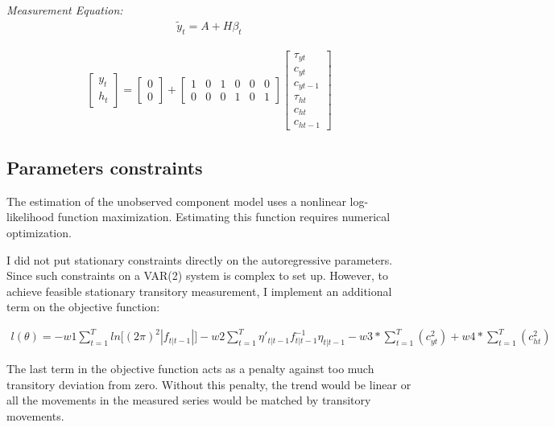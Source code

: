 \documentclass[12pt]{article}
\begin{document}
\begin{outline}[enumerate]
		\bigskip
		\textit{Measurement Equation:}
		\begin{align}
		\tilde{y}_t = A + H\beta_t
		\end{align}
		
		\begin{align*}
		\begin{bmatrix}
		y_t	\\
		h_t
		\end{bmatrix}
		=
		\begin{bmatrix}
		0	\\
		0
		\end{bmatrix}
		+
		\begin{bmatrix}
		1	& 0	& 1	& 0	& 0 & 0 \\
		0	& 0 & 0 & 1 & 0 & 1
		\end{bmatrix}
		\begin{bmatrix}
		\tau_{yt}	\\
		c_{yt}		\\
		c_{yt-1}	\\
		\tau_{ht}	\\
		c_{ht}		\\
		c_{ht-1}
		\end{bmatrix}
		\end{align*}
		
\subsection{Parameters constraints}

The estimation of the unobserved component model uses a nonlinear log-likelihood function maximization. Estimating this function requires numerical optimization.


I did not put stationary constraints directly on the autoregressive parameters. Since such constraints on a VAR(2) system is complex to set up. However, to achieve feasible stationary transitory measurement, I implement an additional term on the objective function:

\begin{align}
l(\theta) = -w1\sum_{t=1}^{T}ln\lbrack(2\pi)^2|f_{t|t-1}|\rbrack
-w2\sum_{t=1}^{T}\eta'_{t|t-1}f^{-1}_{t|t-1}\eta_{t|t-1}
- w3*\sum_{t=1}^{T}(c_{yt}^2) + w4*\sum_{t=1}^{T}(c_{ht}^2)
\end{align}

The last term in the objective function acts as a penalty against too much transitory deviation from zero. Without this penalty, the trend would be linear or all the movements in the measured series would be matched by transitory movements.


\end{outline}
\end{document}
